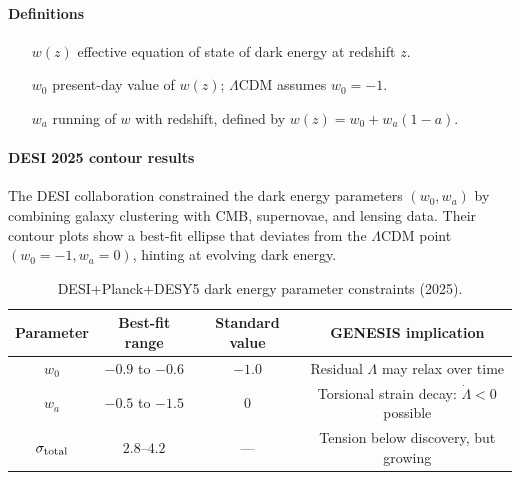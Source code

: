 \documentclass{article}
\begin{document}
\paragraph{Definitions}
\begin{itemize}[leftmargin=*]
  \item[$w(z)$] effective equation of state of dark energy at redshift $z$.
  \item[$w_0$] present-day value of $w(z)$; $\Lambda$CDM assumes $w_0=-1$.
  \item[$w_a$] running of $w$ with redshift, defined by $w(z) = w_0 + w_a(1 - a)$.
\end{itemize}

\paragraph{DESI 2025 contour results}
The DESI collaboration constrained the dark energy parameters $(w_0, w_a)$ by combining galaxy clustering with CMB, supernovae, and lensing data. Their contour plots show a best-fit ellipse that deviates from the $\Lambda$CDM point $(w_0 = -1, w_a = 0)$, hinting at evolving dark energy.

\begin{table}[h!]
\centering
\renewcommand{\arraystretch}{1.2}
\begin{tabular}{|c|c|c|c|}
\hline
\textbf{Parameter} & \textbf{Best-fit range} & \textbf{Standard value} & \textbf{GENESIS implication} \\
\hline
$w_0$ & $-0.9$ to $-0.6$ & $-1.0$ & Residual $\Lambda$ may relax over time \\
\hline
$w_a$ & $-0.5$ to $-1.5$ & $0$ & Torsional strain decay: $\dot\Lambda < 0$ possible \\
\hline
$\sigma_{\rm total}$ & $2.8$–$4.2$ & — & Tension below discovery, but growing \\
\hline
\end{tabular}
\caption{DESI+Planck+DESY5 dark energy parameter constraints (2025).}
\label{tab:DESI-contour}
\end{table}
\end{document}
